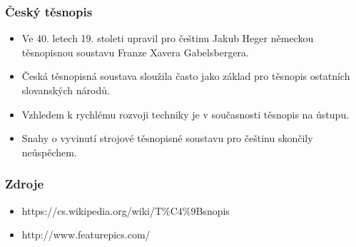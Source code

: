 \documentclass{beamer}
\begin{document}
 \begin{frame}
\frametitle{Český těsnopis}
   \begin{itemize}[<+->]
   \item Ve 40. letech 19. stoleti upravil pro češtinu Jakub Heger německou těsnopisnou soustavu Franze Xavera Gabelsbergera.
   \item Česká těsnopisná soustava sloužila často jako základ pro těsnopis ostatních slovanských národů.
   \item Vzhledem k rychlému rozvoji techniky je v současnosti těsnopis na ústupu.
   \item Snahy o vyvinutí strojové těsnopisné soustavu pro češtinu skončily neúspěchem.
   \end{itemize}
 \end{frame}
\begin{frame}
\frametitle{Zdroje}
 \begin{itemize}
     \item https://cs.wikipedia.org/wiki/T\%C4\%9Bsnopis
     \item http://www.featurepics.com/
 \end{itemize}
\end{frame}
\end{document}

